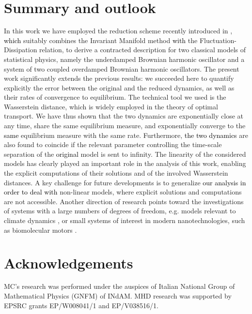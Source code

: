 \documentclass[a4paper,twoside]{article}      %
\theoremstyle{definition}
\newcommand{\AM}{\textcolor{black}}
\begin{document}
\section{Summary and outlook}
\label{sec:sec5}
In this work we have employed the reduction scheme recently introduced in \cite{CM22,CDM22}, \AM{which} suitably combines the Invariant Manifold method \AM{ with} the Fluctuation-Dissipation relation, to derive a contracted description for two classical models of statistical physics, namely  the underdamped Brownian harmonic oscillator and a system of two coupled overdamped Brownian harmonic oscillators. The present work significantly extends the previous results: we succeeded here to quantify explicitly the error between the original and the reduced dynamics, as well as their rates of convergence to equilibrium. The technical tool we used is the Wasserstein distance, which is widely employed in the theory of optimal transport. We have thus shown that the two dynamics are exponentially close at any time, share the same equilibrium measure, and exponentially converge to the \AM{same} equilibrium measure with the same rate. Furthermore, \AM{the two dynamics} are also found to coincide if the relevant parameter controlling the time-scale separation of the \AM{original} model is sent to infinity. The linearity of the considered models has clearly played an important role in the analysis of this work, enabling the explicit computations of their solutions and of the involved Wasserstein distances. A key challenge for future developments is to generalize \AM{our analysis in order to deal with} non-linear models, where explicit solutions and computations are not accessible. Another direction of research points toward the investigations of systems with a large numbers of degrees of freedom, e.g. models relevant to climate dynamics \cite{hummel2023reduction}, or small systems of interest in modern nanotechnologies, such as biomolecular motors \cite{Tang16}.

\section*{Acknowledgements}
MC's research was performed under
the auspices of Italian National Group of Mathematical Physics (GNFM) of INdAM. MHD research was supported by EPSRC grants EP/W008041/1 and EP/V038516/1.
\end{document}
